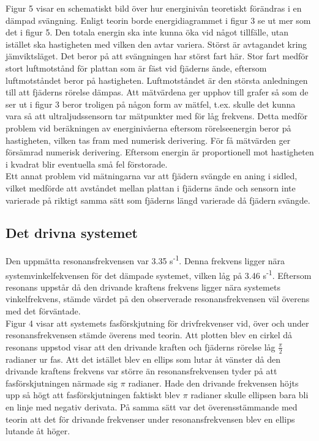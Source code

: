 \documentclass[a4paper,10pt]{article}
\begin{document}
Figur 5 visar en schematiskt bild över hur energinivån teoretiskt förändras i en dämpad svängning. Enligt teorin borde energidiagrammet i figur 3 se ut mer som det i figur 5. Den totala energin ska inte kunna öka vid något tillfälle, utan istället ska hastigheten med vilken den avtar variera. Störst är avtagandet kring jämviktsläget. Det beror på att svängningen har störst fart här. Stor fart medför stort luftmotstånd för plattan som är fäst vid fjäderns ände, eftersom luftmotståndet beror på hastigheten. Luftmotståndet är den största anledningen till att fjäderns rörelse dämpas. Att mätvärdena ger upphov till grafer så som de ser ut i figur 3 beror troligen på någon form av mätfel, t.ex. skulle det kunna vara så att ultraljudssensorn tar mätpunkter med för låg frekvens. Detta medför problem vid beräkningen av energinivåerna eftersom rörelseenergin beror på hastigheten, vilken tas fram med numerisk derivering. För få mätvärden ger försämrad numerisk derivering. Eftersom energin är proportionell mot hastigheten i kvadrat blir eventuella små fel förstorade.\\
\indent Ett annat problem vid mätningarna var att fjädern svängde en aning i sidled, vilket medförde att avståndet mellan plattan i fjäderns ände och sensorn inte varierade på riktigt samma sätt som fjäderns längd varierade då fjädern svängde.

\subsection{Det drivna systemet}
Den uppmätta resonansfrekvensen var 3.35 s\textsuperscript{-1}. Denna frekvens ligger nära systemvinkelfekvensen för det dämpade systemet, vilken låg på 3.46 s\textsuperscript{-1}. Eftersom resonans uppstår då den drivande kraftens frekvens ligger nära systemets vinkelfrekvens, stämde värdet på den observerade resonansfrekvensen väl överens med det förväntade.\\
\indent Figur 4 visar att systemets fasförskjutning för drivfrekvenser vid, över och under resonansfrekvensen stämde överens med teorin. Att plotten blev en cirkel då resonans uppstod visar att den drivande kraften och fjäderns rörelse låg $\frac{\pi}{2}$ radianer ur fas. Att det istället blev en ellips som lutar åt vänster då den drivande kraftens frekvens var större än resonansfrekvensen tyder på att fasförskjutningen närmade sig $\pi$ radianer. Hade den drivande frekvensen höjts upp så högt att fasförskjutningen faktiskt blev $\pi$ radianer skulle ellipsen bara bli en linje med negativ derivata. På samma sätt var det överensstämmande med teorin att det för drivande frekvenser under resonansfrekvensen blev en ellips lutande åt höger.
\end{document}
